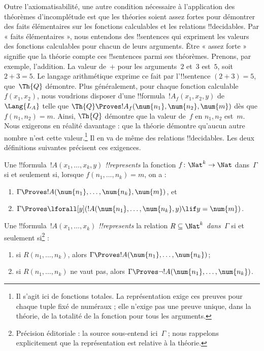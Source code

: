 \documentclass[../../../include/open-logic-section]{subfiles}
\begin{document}
Outre l'axiomatisabilité, une autre condition nécessaire à
l'application des théorèmes d'incomplétude est que les théories
soient assez fortes pour démontrer des faits élémentaires sur les
fonctions calculables et les relations !!{decidable}s. Par « faits
élémentaires », nous entendons des !!{sentence}s qui expriment les
valeurs des fonctions calculables pour chacun de leurs arguments.
Être « assez forte » signifie que la théorie compte ces
!!{sentence}s parmi ses théorèmes. Prenons, par exemple, l'addition.
La valeur de~$+$ pour les arguments~$2$ et~$3$ est~$5$, soit
$2+3=5$. Le langage arithmétique exprime ce fait par l'!!{sentence}
$(\num{2}+\num{3})=\num{5}$, que~$\Th{Q}$ démontre.
Plus généralement, pour chaque fonction calculable~$f(x_1,x_2)$,
nous voudrions disposer d'une !!{formula}~$!A_f(x_1,x_2,y)$
de~$\Lang{L_A}$ telle que $\Th{Q}\Proves
!A_f(\num{n_1},\num{n_2},\num{m})$ dès que $f(n_1,n_2)=m$.
Ainsi, $\Th{Q}$ démontre que la valeur de~$f$ en $n_1,n_2$
est~$m$. Nous exigerons en réalité davantage : que la théorie
démontre qu'aucun autre nombre n'est cette valeur.\footnote{Il s'agit ici de fonctions totales. La représentation exige ces preuves pour chaque tuple fixé de numéraux ; elle n'exige pas une preuve unique, dans la théorie, de la totalité de la fonction pour tous les arguments.} Il en va de
même des relations !!{decidable}s. Les deux définitions suivantes
précisent ces exigences.

\begin{defn}
Une !!{formula}~$!A(x_1,\dots,x_k,y)$ \emph{!!{represents}} la
fonction $f\colon\Nat^k\to\Nat$ dans~$\Gamma$ si et seulement si,
lorsque $f(n_1,\dots,n_k)=m$, on a :
\begin{enumerate}
\item $\Gamma \Proves !A(\num{n_1}, \dots, \num{n_k}, \num{m})$, et
\item $\Gamma \Proves \lforall[y](!A(\num{n_1}, \dots, \num{n_k},
y) \lif y = \num{m})$.
\end{enumerate}
\end{defn}

\begin{defn}
Une !!{formula}~$!A(x_1,\dots,x_k)$ \emph{!!{represents}} la
relation $R\subseteq\Nat^k$ \emph{dans~$\Gamma$} si et seulement si\footnote{Précision éditoriale : la source sous-entend ici~$\Gamma$ ; nous rappelons explicitement que la représentation est relative à la théorie.} :
\begin{enumerate}
\item si $R(n_1,\dots,n_k)$, alors $\Gamma \Proves !A(\num{n_1},
\dots, \num{n_k})$;
\item si $R(n_1,\dots,n_k)$ ne vaut pas, alors $\Gamma \Proves \lnot
!A(\num{n_1}, \dots, \num{n_k})$.
\end{enumerate}
\end{defn}
\end{document}
